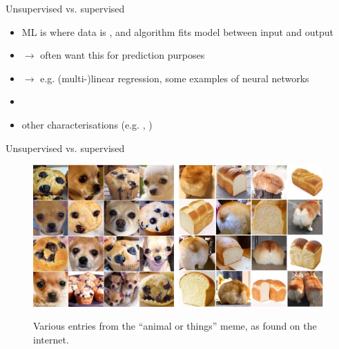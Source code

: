 \documentclass[xcolor=x11names,compress]{beamer}
\renewcommand{\(}{\begin{columns}}
\renewcommand{\)}{\end{columns}}
\newcommand{\<}[1]{\begin{column}{#1}}
\renewcommand{\>}{\end{column}}
\begin{document}

\begin{frame}{Unsupervised vs. supervised}

\begin{itemize}
  \item {} ML is where data is , and
  algorithm fits model between input and output
  \item[] $\to$ often want this for prediction purposes
  \item[] $\to$ e.g. (multi-)linear regression, some examples of neural networks
  \item[]
  \item other characterisations (e.g. ,
  )
\end{itemize}

\end{frame}


\begin{frame}{Unsupervised vs. supervised}

\begin{figure}
  \includegraphics[width=0.48\textwidth]{muffin}\hspace*{1mm}\includegraphics[width=0.51\textwidth]{bread}
  \caption{Various entries from the ``animal or things'' meme, as found on the
  internet.}
\end{figure}

\end{frame}
\end{document}
